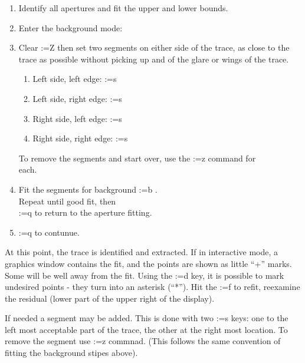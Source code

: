 \documentclass[letter,11pt,oneside]{article}
\makeatletter
\newcommand\llbox[1]{%
  \@tfor\@ii:=#1\do{%
    {\color{verbcolor}\Ovalbox{\strut\@ii}}%
  }%
}
\makeatother
\begin{document}
\vspace{-.15cm}
\begin{enumerate}\addtolength{\itemsep}{-0.5\baselineskip}
   \item   Identify all apertures and fit the upper and lower bounds.
   \item   Enter the background mode:
   \item   Clear \llbox{Z} then set two segments on either side of the trace,
      as close to the trace as possible without picking up and of the glare
      or wings of the trace.

\vspace{-.15cm}
\begin{enumerate}\addtolength{\itemsep}{-0.5\baselineskip}
   \item   Left side, left edge:\llbox{s}
   \item   Left side, right edge:\llbox{s}
   \item   Right side, left edge:\llbox{s}
   \item   Right side, right edge:\llbox{s}
\end{enumerate}


      To remove the segments and start over, use the \llbox{z} command for\\
      each.
   
   \item   Fit the segments for background \llbox{b}. \\
         Repeat until good fit, then\\
      \llbox{q} to return to the aperture fitting.
   \item   \llbox{q} to contunue.
\end{enumerate}

At this point, the trace is identified and extracted. If in interactive mode,
a graphics window contains the fit, and the points are shown as little ``+''
marks. Some will be well away from the fit. Using the \llbox{d} key, it is
possible to mark undesired points - they turn into an asterisk (``*''). Hit
the \llbox{f} to refit, reexamine the residual (lower part of the upper right
of the display).

If needed a segment may be added. This is done with two \llbox{s} keys:
one to the left most acceptable part of the trace, the other at the right most
location. To remove the segment use \llbox{z} commnad. (This follows the same
convention of fitting the background stipes above).
\end{document}
